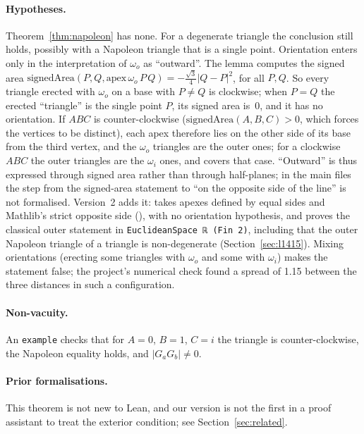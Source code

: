 \documentclass[11pt]{article}
\theoremstyle{definition}
\theoremstyle{remark}
\newcommand{\lean}[1]{\texttt{#1}}
\begin{document}
\paragraph{Hypotheses.} Theorem~\ref{thm:napoleon} has none. For a degenerate triangle the
conclusion still holds, possibly with a Napoleon triangle that is a single point. Orientation
enters only in the interpretation of $\omega_o$ as ``outward''. The lemma
 computes the signed area
$\mathrm{signedArea}(P,Q,\mathrm{apex}\,\omega_o\,P\,Q)=-\tfrac{\sqrt3}4|Q-P|^2$, for all $P,Q$. So
every triangle erected with $\omega_o$ on a base with $P\ne Q$ is clockwise; when $P=Q$ the erected
``triangle'' is the single point $P$, its signed area is~$0$, and it has no orientation. If $ABC$
is counter-clockwise ($\mathrm{signedArea}(A,B,C)>0$, which forces the vertices to be distinct),
each apex therefore lies on the other side of its base from the third vertex, and the $\omega_o$
triangles are the outer ones; for a clockwise $ABC$ the outer triangles are the $\omega_i$ ones,
and  covers that case. ``Outward'' is thus expressed through signed
area rather than through half-planes; in the main files the step from the signed-area statement to ``on the opposite
side of the line'' is not formalised. Version~2 adds it:  takes
apexes defined by equal sides and Mathlib's strict opposite side
(), with no orientation hypothesis, and
 proves the classical outer statement in
\lean{EuclideanSpace ℝ (Fin 2)}, including that the outer Napoleon triangle of a triangle is
non-degenerate (Section~\ref{sec:l1415}). Mixing orientations (erecting some triangles with $\omega_o$
and some with $\omega_i$) makes the statement false; the project's numerical check found a spread
of 1.15 between the three distances in such a configuration.

\paragraph{Non-vacuity.} An \lean{example} checks that for $A=0$, $B=1$, $C=i$ the triangle is
counter-clockwise, the Napoleon equality holds, and $|G_aG_b|\ne0$.

\paragraph{Prior formalisations.} This theorem is not new to Lean, and our version is not the first
in a proof assistant to treat the exterior condition; see Section~\ref{sec:related}.
\end{document}
